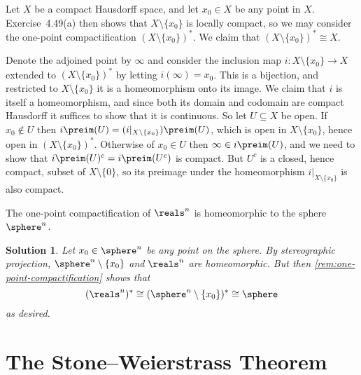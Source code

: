 \documentclass[article, a4paper, 11pt, oneside]{memoir}
\numberwithin{equation}{chapter}
\theoremstyle{nonumberplain}
\newtheorem{solution}{Solution}
\begin{document}
\begin{remark}
	\label{rem:one-point-compactification}
	Let $X$ be a compact Hausdorff space, and let $x_0 \in X$ be any point in $X$. Exercise~4.49(a) then shows that $X \setminus \{x_0\}$ is locally compact, so we may consider the one-point compactification $(X \setminus \{x_0\})^*$. We claim that $(X \setminus \{x_0\})^* \cong X$.
	
	Denote the adjoined point by $\infty$ and consider the inclusion map $i \colon X \setminus \{x_0\} \to X$ extended to $(X \setminus \{x_0\})^*$ by letting $i(\infty) = x_0$. This is a bijection, and restricted to $X \setminus \{x_0\}$ it is a homeomorphism onto its image. We claim that $i$ is itself a homeomorphism, and since both its domain and codomain are compact Hausdorff it suffices to show that it is continuous. So let $U \subseteq X$ be open. If $x_0 \not\in U$ then $i\preim(U) = (i|_{X \setminus \{x_0\}})\preim(U)$, which is open in $X \setminus \{x_0\}$, hence open in $(X \setminus \{x_0\})^*$. Otherwise of $x_0 \in U$ then $\infty \in i\preim(U)$, and we need to show that $i\preim(U)^c = i\preim(U^c)$ is compact. But $U^c$ is a closed, hence compact, subset of $X \setminus \{0\}$, so its preimage under the homeomorphism $i|_{X \setminus \{x_0\}}$ is also compact.
\end{remark}


\begin{exerciseframed}[52]
	The one-point compactification of $\reals^n$ is homeomorphic to the sphere $\sphere^n$.
\end{exerciseframed}

\begin{solution}
	Let $x_0 \in \sphere^n$ be any point on the sphere. By stereographic projection, $\sphere^n \setminus \{x_0\}$ and $\reals^n$ are homeomorphic. But then \cref{rem:one-point-compactification} shows that
	\begin{equation*}
		(\reals^n)^*
			\cong (\sphere^n \setminus \{x_0\})^*
			\cong \sphere
	\end{equation*}
	as desired.
\end{solution}


\addtocounter{section}{1}
\section{The Stone--Weierstrass Theorem}
\end{document}
